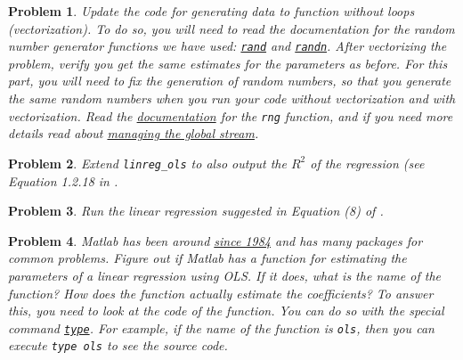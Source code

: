 \documentclass[12pt, a4paper]{article}
\newtheorem{problem}{Problem}
\begin{document}
\begin{problem}
Update the code for generating data to function without loops (vectorization).
To do so, you will need to read the documentation for the random number generator functions we have used: \href{https://www.mathworks.com/help/matlab/ref/rand.html}{\texttt{rand}} and \href{https://www.mathworks.com/help/matlab/ref/randn.html}{\texttt{randn}}.
After vectorizing the problem, verify you get the same estimates for the parameters as before.
For this part, you will need to fix the generation of random numbers, so that you generate the same random numbers when you run your code without vectorization and with vectorization.
Read the \href{https://www.mathworks.com/help/matlab/ref/rng.html}{documentation} for the \texttt{rng} function, and if you need more details read about \href{https://www.mathworks.com/help/matlab/math/managing-the-global-stream.html}{managing the global stream}.
\end{problem}

\begin{problem}
Extend \texttt{linreg\_ols} to also output the \(R^2\) of the regression (see Equation 1.2.18 in \citet{H2000}.
\end{problem}

\begin{problem}
Run the linear regression suggested in Equation (8) of \citet{PB1997}.
\end{problem}

\begin{problem}
Matlab has been around \href{https://www.mathworks.com/company/newsletters/articles/a-brief-history-of-matlab.html}{since 1984} and has many packages for common problems.
Figure out if Matlab has a function for estimating the parameters of a linear regression using OLS.
If it does, what is the name of the function?
How does the function actually estimate the coefficients?
To answer this, you need to look at the code of the function.
You can do so with the special command \href{https://www.mathworks.com/help/matlab/ref/type.html}{\texttt{type}}.
For example, if the name of the function is \texttt{ols}, then you can execute \texttt{type ols} to see the source code.
\end{problem}
\end{document}
